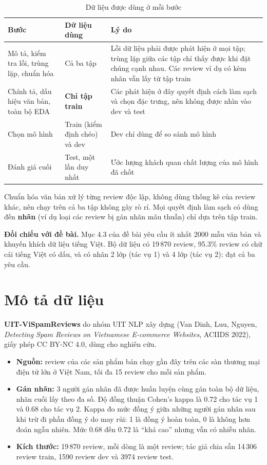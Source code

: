 \begin{table}[H]
\centering
\caption{Dữ liệu được dùng ở mỗi bước}
\label{tab:text-leak}
\begin{tabular}{>{\raggedright\arraybackslash}p{4.6cm}>{\raggedright\arraybackslash}p{2.6cm}>{\raggedright\arraybackslash}p{7.2cm}}
\toprule
Bước & Dữ liệu dùng & Lý do\\
\midrule
Mô tả, kiểm tra lỗi, trùng lặp, chuẩn hóa & Cả ba tập & Lỗi dữ liệu phải được phát hiện ở mọi tập; trùng lặp giữa các tập chỉ thấy được khi đặt chúng cạnh nhau. Các review ví dụ có kèm nhãn vẫn lấy từ tập train\\
Chính tả, dấu hiệu văn bản, toàn bộ EDA & \textbf{Chỉ tập train} & Các phát hiện ở đây quyết định cách làm sạch và chọn đặc trưng, nên không được nhìn vào dev và test\\
Chọn mô hình & Train (kiểm định chéo) và dev & Dev chỉ dùng để so sánh mô hình\\
Đánh giá cuối & Test, một lần duy nhất & Ước lượng khách quan chất lượng của mô hình đã chốt\\
\bottomrule
\end{tabular}
\end{table}

Chuẩn hóa văn bản xử lý từng review độc lập, không dùng thống kê của review khác, nên chạy trên cả ba tập không gây rò rỉ.
Mọi quyết định làm sạch có dùng đến \textbf{nhãn} (ví dụ loại các review bị gán nhãn mâu thuẫn) chỉ dựa trên tập train.

\textbf{Đối chiếu với đề bài.} Mục 4.3 của đề bài yêu cầu ít nhất 2000 mẫu văn bản và khuyến khích dữ liệu tiếng Việt.
Bộ dữ liệu có 19\,870 review, 95.3\% review có chữ cái tiếng Việt có dấu, và có nhãn 2 lớp (tác vụ 1) và 4 lớp (tác vụ 2): đạt cả ba yêu cầu.

\section{Mô tả dữ liệu}
\label{sec:text-describe}

\textbf{UIT-ViSpamReviews} do nhóm UIT NLP xây dựng (Van Dinh, Luu, Nguyen, \textit{Detecting Spam Reviews on Vietnamese
E-commerce Websites}, ACIIDS 2022), giấy phép CC BY-NC 4.0, dùng cho nghiên cứu.
\begin{itemize}[leftmargin=1.5cm]
    \item \textbf{Nguồn:} review của các sản phẩm bán chạy gần đây trên các sàn thương mại điện tử lớn ở Việt Nam, tối đa 15 review cho mỗi sản phẩm.
    \item \textbf{Gán nhãn:} 3 người gán nhãn đã được huấn luyện cùng gán toàn bộ dữ liệu, nhãn cuối lấy theo đa số.
          Độ đồng thuận Cohen's kappa là 0.72 cho tác vụ 1 và 0.68 cho tác vụ 2. Kappa đo mức đồng ý giữa những người gán nhãn
          sau khi trừ đi phần đồng ý do may rủi: 1 là đồng ý hoàn toàn, 0 là không hơn đoán ngẫu nhiên. Mức 0.68 đến 0.72 là
          ``khá cao'' nhưng vẫn có nhiễu nhãn.
    \item \textbf{Kích thước:} 19\,870 review, mỗi dòng là một review; tác giả chia sẵn 14\,306 review train, 1590 review dev và 3974 review test.
\end{itemize}

